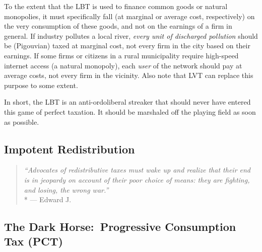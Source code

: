To the extent that the LBT is used to finance common goods or natural monopolies, it must specifically fall (at marginal or average cost, respectively) on the very consumption of these goods, and not on the earnings of a firm in general.
If industry pollutes a local river, \emph{every unit of discharged pollution} should be (Pigouvian) taxed at marginal cost, not every firm in the city based on their earnings.
If some firms or citizens in a rural municipality require high-speed internet access (a natural monopoly), each \emph{user} of the network should pay at average costs, not every firm in the vicinity.
Also note that LVT can replace this purpose to some extent.

In short, the LBT is an anti-ordoliberal streaker that should never have entered this game of perfect taxation.
It should be marshaled off the playing field as soon as possible.

\subsection{Impotent Redistribution}

\begin{quote}
	\emph{``Advocates of redistributive taxes must wake up and realize that their end is in jeopardy on account of their poor choice of means:
	they are fighting, and losing, the wrong war.''}
	\\*
	--- Edward J.\ \citet[848]{McCaffery2005}
\end{quote}


\subsection[Progressive Consumption Tax]{The Dark Horse:~Progressive Consumption Tax (PCT)}
	\label{sec:ScorePCT}





